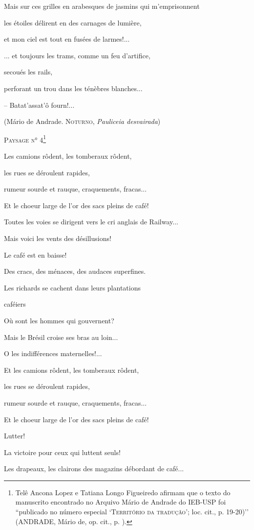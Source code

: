 Mais sur ces grilles en arabesques de jasmins qui m'emprisonnent

les étoiles délirent en des carnages de lumière,

et mon ciel est tout en fusées de larmes!...

... et toujours les trams, comme un feu d'artifice,

secoués les rails,

perforant un trou dans les ténèbres blanches...

-- Batat'assat'ô fourn!...

(Mário de Andrade\textsc{. Noturno,} \emph{Pauliceia
desvairada}\textsc{)}

\textsc{Paysage n° 4}\footnote{Telê Ancona Lopez e Tatiana Longo
  Figueiredo afirmam que o texto do manuscrito encontrado no Arquivo
  Mário de Andrade do IEB-USP foi ``publicado no número especial
  `\textsc{Território da tradução'}; loc. cit., p. 19-20)'' (ANDRADE,
  Mário de, op. cit., p. ).}

Les camions rôdent, les tomberaux rôdent,

les rues se déroulent rapides,

rumeur sourde et rauque, craquements, fracas...

Et le choeur large de l'or des sacs pleins de café!

Toutes les voies se dirigent vers le cri anglais de Railway...

Mais voici les vents des désillusions!

Le café est en baisse!

Des cracs, des ménaces, des audaces superfines.

Les richards se cachent dans leurs plantations

caféiers

Où sont les hommes qui gouvernent?

Mais le Brésil croise ses bras au loin...

O les indifférences maternelles!...

Et les camions rôdent, les tomberaux rôdent,

les rues se déroulent rapides,

rumeur sourde et rauque, craquements, fracas...

Et le choeur large de l'or des sacs pleins de café!

Lutter!

La victoire pour ceux qui luttent seuls!

Les drapeaux, les clairons des magazins débordant de café...

